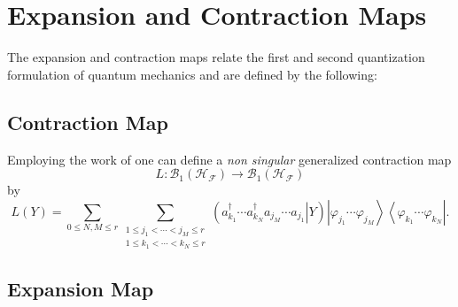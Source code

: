 \documentclass[aps,preprint,amsfonts,amssymb,showpacs,showkeys]{revtex4}%
\begin{document}
\section{Expansion and Contraction Maps \label{Expansion and Contraction}}

The expansion and contraction maps relate the first and second quantization
formulation of quantum mechanics and are defined by the following:

\subsection{Contraction Map \label{Contraction}}

Employing the work of \cite{Kummar70} one can define a \emph{non singular
}generalized contraction map
\begin{equation}
L:\mathcal{B}_{1}\left(  \mathcal{H}_{\mathcal{F}}\right)  \rightarrow
\mathcal{B}_{1}\left(  \mathcal{H}_{\mathcal{F}}\right)
\end{equation}
by
\begin{equation}
L\left(  Y\right)  =\sum_{0\leq N,M\leq r}\sum_{\substack{1\leq j_{1}%
<\cdots<j_{M}\leq r\\1\leq k_{1}<\cdots<k_{N}\leq r}}\left(  \left.  a_{k_{1}%
}^{\dagger}\cdots a_{k_{N}}^{\dagger}a_{j_{M}}\cdots a_{j_{1}}\right\vert
Y\right)  \left\vert \varphi_{j_{1}}\cdots\varphi_{j_{M}}\right\rangle
\left\langle \varphi_{k_{1}}\cdots\varphi_{k_{N}}\right\vert . \label{CONT}%
\end{equation}


\subsection{Expansion Map \label{Expansion}}
\end{document}
